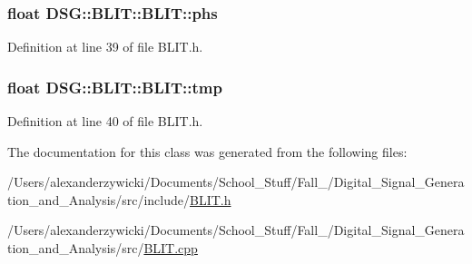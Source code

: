 \hypertarget{classDSG_1_1BLIT_1_1BLIT_aa3e9fc9fd7ed43eb583d43c36329afb6}{
\subsubsection[{phs}]{\setlength{\rightskip}{0pt plus 5cm}float D\-S\-G\-::\-B\-L\-I\-T\-::\-B\-L\-I\-T\-::phs\hspace{0.3cm}{\ttfamily [protected]}}}\label{classDSG_1_1BLIT_1_1BLIT_aa3e9fc9fd7ed43eb583d43c36329afb6}


Definition at line 39 of file B\-L\-I\-T.\-h.

\hypertarget{classDSG_1_1BLIT_1_1BLIT_a9e6750c5ef251bce48cdb55ed45697bb}{
\subsubsection[{tmp}]{\setlength{\rightskip}{0pt plus 5cm}float D\-S\-G\-::\-B\-L\-I\-T\-::\-B\-L\-I\-T\-::tmp\hspace{0.3cm}{\ttfamily [protected]}}}\label{classDSG_1_1BLIT_1_1BLIT_a9e6750c5ef251bce48cdb55ed45697bb}


Definition at line 40 of file B\-L\-I\-T.\-h.



The documentation for this class was generated from the following files\-:\begin{DoxyCompactItemize}
\item 
/\-Users/alexanderzywicki/\-Documents/\-School\-\_\-\-Stuff/\-Fall\-\_/\-Digital\-\_\-\-Signal\-\_\-\-Generation\-\_\-and\-\_\-\-Analysis/src/include/\hyperlink{BLIT_8h}{B\-L\-I\-T.\-h}\item 
/\-Users/alexanderzywicki/\-Documents/\-School\-\_\-\-Stuff/\-Fall\-\_/\-Digital\-\_\-\-Signal\-\_\-\-Generation\-\_\-and\-\_\-\-Analysis/src/\hyperlink{BLIT_8cpp}{B\-L\-I\-T.\-cpp}\end{DoxyCompactItemize}
